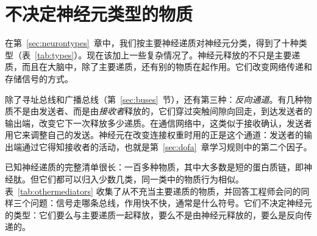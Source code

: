 \chapter{不决定神经元类型的物质}
\label{sec:othermediators}

在第~\ref{sec:neurontypes}~章中，我们按主要神经递质对神经元分类，得到了十种类型（表~\ref{tab:types}）。现在该加上一些复杂情况了。神经元释放的不只是主要递质，而且在大脑中，除了主要递质，还有别的物质在起作用。它们改变网络传递和存储信号的方式。

除了寻址总线和广播总线（第~\ref{sec:buses}~节），还有第三种：\emph{反向通道}。有几种物质不是由发送者、而是由\emph{接收者}释放的，它们穿过突触间隙向回走，到达发送者的输出端，改变它下一次释放多少递质。在通信网络中，这类似于接收确认，发送者用它来调整自己的发送。神经元在改变连接权重时用的正是这个通道：发送者的输出端通过它得知接收者的活动，也就是第~\ref{sec:dofa}~章学习规则中的第二个因子。

已知神经递质的完整清单很长：一百多种物质，其中大多数是短的蛋白质链，即神经肽。但它们都可以归入少数几类，同一类中的物质行为相似。表~\ref{tab:othermediators} 收集了从不充当主要递质的物质，并回答工程师会问的同样三个问题：信号走哪条总线，作用快不快，通常是什么符号。它们不决定神经元的类型：它们要么与主要递质一起释放，要么不是由神经元释放的，要么是反向传递的。

